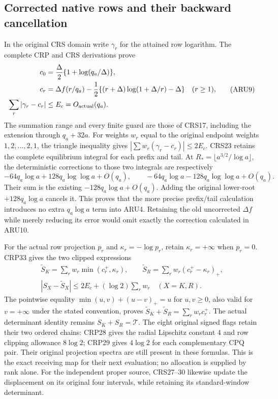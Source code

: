 \subsection{Corrected native rows and their backward cancellation}
In the original CRS domain write $\gamma_r$ for the attained row
logarithm. The complete CRP and CRS derivations prove
\[
\begin{split}
 c_0&=\frac\Delta2\{1+\log(q_a/\Delta)\},\\
 c_r&=\Delta f(r/q_a)-\frac12
       \{(r+\Delta)\log(1+\Delta/r)-\Delta\}\quad(r\ge1),\\
 \sum_r|\gamma_r-c_r|&\le E_c=O_{\rm actual}(q_a).
\end{split}\tag{ARU9}
\]
The summation range and every finite guard are those of CRS17,
including the extension through $q_a+32a$. For weights $w_r$ equal
to the original endpoint weights $1,2,\ldots,2,1$, the triangle
inequality gives $|\sum w_r(\gamma_r-c_r)|\le2E_c$.
CRS23 retains the complete equilibrium integral for each prefix and
tail. At $R_*=\lfloor a^{3/2}/\log a\rfloor$, the deterministic
corrections to those two integrals are respectively
\[
 -64q_a\log a+128q_a\log\log a+O(q_a),\qquad
 -64q_a\log a-128q_a\log\log a+O(q_a).
 \tag{ARU10}
\]
Their sum is the existing $-128q_a\log a+O(q_a)$. Adding the
original lower-root $+128q_a\log a$ cancels it. This proves that the
more precise prefix/tail calculation introduces no extra
$q_a\log a$ term into ARU4. Retaining the old uncorrected
$\Delta f$ while merely reducing its error would omit exactly
the correction calculated in ARU10.

For the actual row projection $p_r$ and
$\kappa_r=-\log p_r$, retain $\kappa_r=+\infty$ when $p_r=0$.
CRP33 gives the two clipped expressions
\[
\begin{gathered}
 \widetilde S_K=\sum_r w_r\min(c_r^+,\kappa_r),\qquad
 \widetilde S_R=\sum_r w_r(c_r^+-\kappa_r)_+,\\
 |S_X-\widetilde S_X|\le2E_c+(\log2)\sum_r w_r\quad(X=K,R).
\end{gathered}
 \tag{ARU11}
\]
The pointwise equality
$\min(u,v)+(u-v)_+=u$ for $u,v\ge0$, also valid for $v=+\infty$
under the stated convention, proves
$\widetilde S_K+\widetilde S_R=\sum_rw_rc_r^+$.
The actual determinant identity remains $S_K+S_R=\mathcal T$.
The eight original signed flags retain their two ordered chains:
CRP28 gives the radial Lipschitz constant $4$ and row clipping
allowance $8\log2$; CRP29 gives $4\log2$ for each complementary
CPQ pair. Their original projection spectra are still present
in these formulas. This is the exact receiving map for their
next evaluation; no allocation is supplied by rank alone.
For the independent proper source, CRS27--30 likewise update
the displacement on its original four intervals, while retaining
its standard-window determinant.

